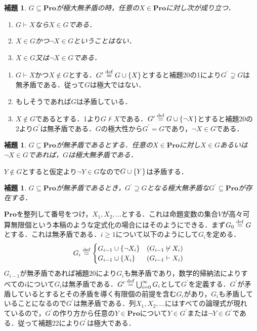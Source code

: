 \documentclass{ltjsarticle}
\makeatletter
\theoremstyle{mystyle1}
\theoremstyle{mystyle3}
\newtheorem{lem}[cor]{補題}
\theoremstyle{mystyle2}
\renewenvironment{proof}[1][\proofname]{\par
  \pushQED{\qed}%
  \normalfont
  \topsep6\p@\@plus6\p@ \trivlist
  \item[\hskip\labelsep{\bfseries\sffamily #1}]\ignorespaces
}{%
  \popQED\endtrivlist\@endpefalse
}
\renewcommand\proofname{証明:}
\newcommand{\bPro}{\ensuremath{\mathbf{Pro}}}
\newcommand{\dequal}{\ensuremath{\stackrel{\rm{def}}{=}}}
\makeatother
\begin{document}
\begin{lem}
  $G\subseteq\bPro$が極大無矛盾の時，任意の$X\in\bPro$に対し次が成り立つ．
  \begin{enumerate}
    \item $G\vdash X$なら$X\in G$である．
    \item $X\in G$かつ$\neg X\in G$ということはない．
    \item $X\in G$又は$\neg X\in G$である．
  \end{enumerate}
\end{lem}
\begin{proof}
  \begin{enumerate}
    \item $G\vdash X$かつ$X\not\in G$とする．$G^\prime\dequal G\cup\qty{X}$とすると補題20の1により$G^\prime\supsetneq G$は無矛盾である．従って$G$は極大ではない．
    \item もしそうであれば$G$は矛盾している．
    \item $X\not\in G$であるとする．1より$G\not\vdash X$である．$G^\prime\dequal G\cup\qty{\neg X}$とすると補題20の2より$G^\prime$は無矛盾である．$G$の極大性から$G^\prime = G$であり，$\neg X\in G$である．
  \end{enumerate}
\end{proof}
\begin{lem}
  $G\subseteq\bPro$が無矛盾であるとする．任意の$X\in\bPro$に対し$X\in G$あるいは$\neg X\in G$であれば，$G$は極大無矛盾である．
\end{lem}
\begin{proof}
  $Y\not\in G$とすると仮定より$\neg Y\in G$なので$G\cup \qty{Y}$は矛盾する．
\end{proof}
\begin{lem}
  $G\subseteq\bPro$が無矛盾であるとき，$G^\prime\supseteq G$となる極大無矛盾な$G^\prime\subseteq\bPro$が存在する．
\end{lem}
\begin{proof}
  \bPro を整列して番号をつけ，$X_1,X_2,\ldots$とする．これは命題変数の集合$V$が高々可算無限個という本稿のような定式化の場合にはそのようにできる．まず$G_0\dequal G$とする．これは無矛盾である．$i\geq 1$について以下のようにして$G_i$を定める．
  \begin{align*}
    G_i\dequal\begin{cases}
      G_{i-1}\cup\qty{\neg X_i} & \qty(G_{i-1}\not\vdash X_i) \\
      G_{i-1}\cup\qty{X_i} & \qty(G_{i-1}\vdash X_i)
    \end{cases}
  \end{align*}
  $G_{i-1}$が無矛盾であれば補題20により$G_i$も無矛盾であり，数学的帰納法によりすべての$i$について$G_i$は無矛盾である．$G^\prime\dequal\bigcup_{i=0}^\infty G_i$として$G^\prime$を定義する．$G^\prime$が矛盾しているとするとその矛盾を導く有限個の前提を含む$G_i$があり，$G_i$も矛盾していることになるので$G^\prime$は無矛盾である．列$X_1, X_2, \ldots$にはすべての論理式が現れているので，$G^\prime$の作り方から任意の$Y\in\bPro$について$Y\in G^\prime$または$\neg Y\in G^\prime$である．従って補題22により$G^\prime$は極大である．
\end{proof}
\end{document}
